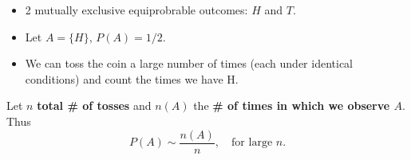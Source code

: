 \documentclass[notes=show]{beamer}\usepackage[]{graphicx}\usepackage[]{color}
\begin{document}
\begin{frame}{\secname}
\begin{example}

\begin{itemize}
\item 2 mutually exclusive equiprobrable outcomes: $H$ and $T$.
\item Let $A = \{H\}$, $P(A)=1/2$.
\item We can toss the coin a large number of times (each under identical conditions) and count the times we have H.
\end{itemize}

Let $n$ \textbf{total \# of tosses} and $n(A)$ the \textbf{\# of times in which we observe $A$}.
Thus $$P(A) \sim \frac{n(A)}{n}, \quad \text{for large $n$}.$$
\end{example}
\end{frame}
\end{document}
